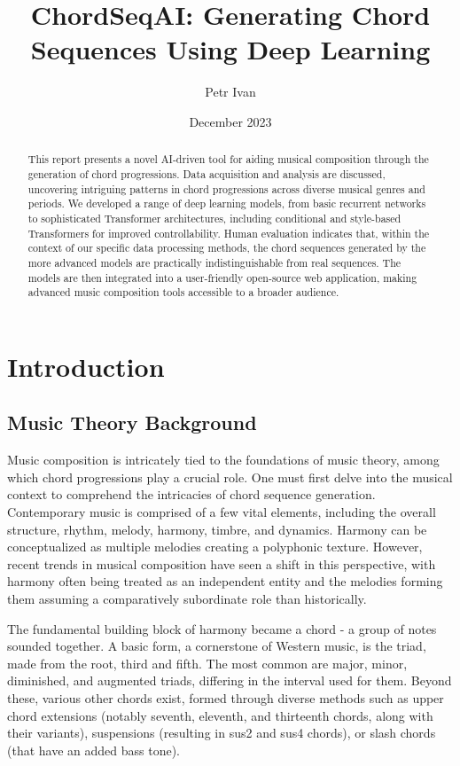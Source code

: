 \documentclass{article}
\title{ChordSeqAI: Generating Chord Sequences Using Deep Learning}
\author{Petr Ivan}
\date{December 2023}
\begin{document}
\newpage

\maketitle

\begin{abstract}
This report presents a novel AI-driven tool for aiding musical composition through the generation of chord progressions. Data acquisition and analysis are discussed, uncovering intriguing patterns in chord progressions across diverse musical genres and periods. We developed a range of deep learning models, from basic recurrent networks to sophisticated Transformer architectures, including conditional and style-based Transformers for improved controllability. Human evaluation indicates that, within the context of our specific data processing methods, the chord sequences generated by the more advanced models are practically indistinguishable from real sequences. The models are then integrated into a user-friendly open-source web application, making advanced music composition tools accessible to a broader audience.
\end{abstract}

\tableofcontents

\newpage

\section{Introduction}

\subsection{Music Theory Background}

Music composition is intricately tied to the foundations of music theory, among which chord progressions play a crucial role. One must first delve into the musical context to comprehend the intricacies of chord sequence generation. Contemporary music is comprised of a few vital elements, including the overall structure, rhythm, melody, harmony, timbre, and dynamics. Harmony can be conceptualized as multiple melodies creating a polyphonic texture. However, recent trends in musical composition have seen a shift in this perspective, with harmony often being treated as an independent entity and the melodies forming them assuming a comparatively subordinate role than historically. 

The fundamental building block of harmony became a chord - a group of notes sounded together. A basic form, a cornerstone of Western music, is the triad, made from the root, third and fifth. The most common are major, minor, diminished, and augmented triads, differing in the interval used for them. Beyond these, various other chords exist, formed through diverse methods such as upper chord extensions (notably seventh, eleventh, and thirteenth chords, along with their variants), suspensions (resulting in sus2 and sus4 chords), or slash chords (that have an added bass tone).
\end{document}
